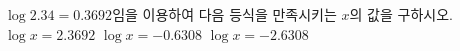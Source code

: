 $\log 2.34=0.3692$임을 이용하여 다음 등식을 만족시키는 $x$의 값을 구하시오.
 $\log x=2.3692$
 $\log x=-0.6308$
 $\log x=-2.6308$
